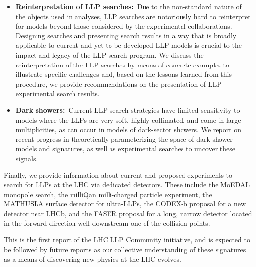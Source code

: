 \begin{itemize}
\item {\bf Reinterpretation of LLP searches:}~Due to the non-standard nature of the objects used in analyses, LLP searches are notoriously hard to reinterpret for models beyond those considered by the experimental collaborations.
Designing searches and presenting search results in a way that is broadly applicable to current and yet-to-be-developed LLP models is crucial to the impact and legacy of the LLP search program.
We discuss the reinterpretation of the LLP searches by means of concrete examples to illustrate specific challenges and, based on the lessons learned from this procedure, we provide recommendations on the presentation of LLP experimental search results.

\item {\bf Dark showers:}~Current LLP search strategies have limited sensitivity to models where the LLPs are very soft, highly collimated, and come in large multiplicities, as can occur in models of dark-sector showers.
We report on recent progress in theoretically parameterizing the space of dark-shower models and signatures, as well as experimental searches to uncover these signals.

\end{itemize}
%
Finally, we provide information about current and proposed experiments to search for LLPs at the LHC via dedicated detectors.
These include the MoEDAL monopole search, the milliQan milli-charged particle experiment, the MATHUSLA surface detector for ultra-LLPs, the CODEX-b proposal for a new detector near LHCb, and the FASER proposal for a long, narrow detector located in the forward direction well downstream one of the collision points.

This is the first report of the LHC LLP Community initiative, and is expected to be followed by future reports as our collective understanding of these signatures as a means of discovering new physics at the LHC evolves.
